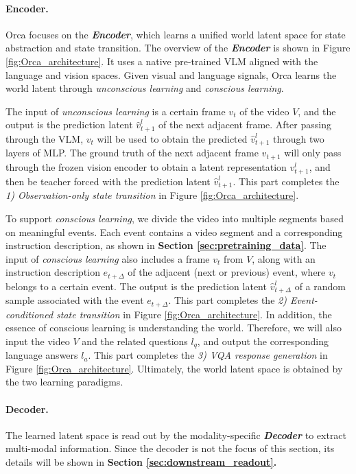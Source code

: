 \paragraph{Encoder.} 
Orca focuses on the \textit{\textbf{Encoder}}, which learns a unified world latent space for state abstraction and state transition.
The overview of the \textit{\textbf{Encoder}} is shown in Figure \ref{fig:Orca_architecture}. It uses a native pre-trained VLM \citep{qwen35} aligned with the language and vision spaces. Given visual and language signals, Orca learns the world latent through \textit{unconscious learning} and \textit{conscious learning}.

The input of \textit{unconscious learning} is a certain frame $v_t$ of the video $V$, and the output is the prediction latent $\hat{v}^l_{t+1}$ of the next adjacent frame. After passing through the VLM, $v_t$ will be used to obtain the predicted $\hat{v}^l_{t+1}$ through two layers of MLP. The ground truth of the next adjacent frame $v_{t+1}$ will only pass through the frozen vision encoder to obtain a latent representation $v^l_{t+1}$, and then be teacher forced with the prediction latent $\hat{v}^l_{t+1}$. This part completes the \textit{1) Observation-only state transition} in Figure \ref{fig:Orca_architecture}.

To support \textit{conscious learning}, we divide the video into multiple segments based on meaningful events. Each event contains a video segment and a corresponding instruction description, as shown in \textbf{Section \ref{sec:pretraining_data}}. The input of \textit{conscious learning} also includes a frame $v_t$ from $V$, along with an instruction description $e_{t+\Delta}$ of the adjacent (next or previous) event, where $v_t$ belongs to a certain event. The output is the prediction latent $\hat{v}^l_{t+\Delta}$ of a random sample associated with the event $e_{t+\Delta}$. This part completes the \textit{2) Event-conditioned state transition} in Figure \ref{fig:Orca_architecture}. In addition, the essence of conscious learning is understanding the world. Therefore, we will also input the video $V$ and the related questions $l_q$, and output the corresponding language answers $l_a$. This part completes the \textit{3) VQA response generation} in Figure \ref{fig:Orca_architecture}. Ultimately, the world latent space is obtained by the two learning paradigms. 

\paragraph{Decoder.} The learned latent space is read out by the modality-specific \textbf{\textit{Decoder}} to extract multi-modal information. Since the decoder is not the focus of this section, its details will be shown in \textbf{Section \ref{sec:downstream_readout}.}

